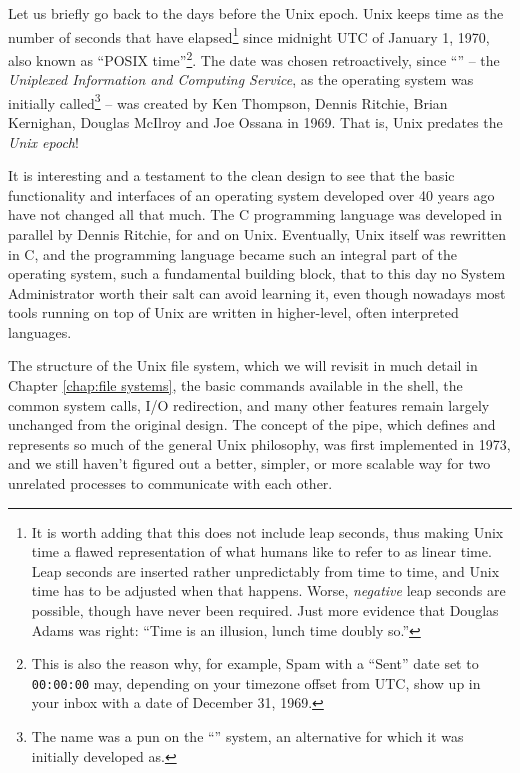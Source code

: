 Let us briefly go back to the days before the  Unix
epoch.  Unix keeps time as the
number of seconds  that have elapsed\footnote{It is
worth adding that this does not include leap seconds,
thus making Unix time a flawed representation of what
humans like to refer to as linear time.  Leap seconds
are inserted rather unpredictably from time to time,
and Unix time has to be adjusted when that happens.
Worse, {\em negative} leap seconds are possible,
though have never been required.  Just more evidence
that Douglas Adams was
right: ``Time is an illusion, lunch time doubly
so.''\cite{history:adams-h2g2}} since midnight UTC of
January 1, 1970, also known as ``POSIX
time''\footnote{This is also the reason why, for
example, Spam with a ``Sent'' date set to
{\tt 00:00:00} may, depending on your timezone offset
from UTC, show up in your inbox with a date of
December 31, 1969.}.  The date was chosen
retroactively, since
``'' -- the {\em
Uniplexed Information and Computing Service}, as the
operating system was initially called\footnote{The
name was a pun on the
``'' system,
an alternative for which it was initially developed
as.} -- was created by Ken
Thompson, Dennis
Ritchie, Brian
Kernighan, Douglas
McIlroy and Joe
Ossana in 1969. That is,
Unix predates the {\em Unix epoch}!

It is interesting and a testament to the clean design
to see that the basic functionality and interfaces of
an operating system developed over 40 years ago have
not changed all that much.  The  C
programming language was developed in parallel by
Dennis Ritchie\cite{history:kr}, for and on Unix.  Eventually,
Unix itself was rewritten in C, and the programming
language became such an integral part of the operating
system, such a fundamental building block, that to
this day no System Administrator worth their salt can
avoid learning it, even though nowadays most tools
running on top of Unix are written in higher-level,
often interpreted languages.

The structure of the Unix file system, which we will
revisit in much detail in Chapter \ref{chap:file
systems}, the basic commands available in the shell,
the common system calls, I/O redirection, and many
other features remain largely unchanged from the
original design.  The concept of the pipe,
which defines and represents so much of the general
Unix philosophy, was first implemented in
1973\cite{history:mcilroy-reader}, and we still
haven't figured out a better, simpler, or more
scalable way for two unrelated processes to
communicate with each other.

